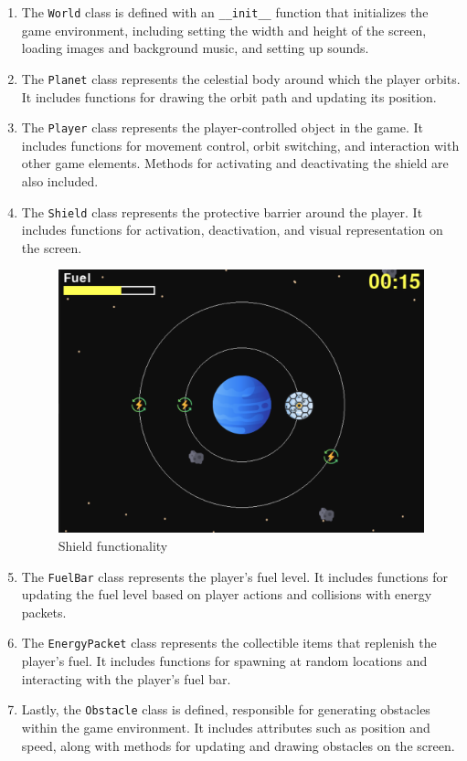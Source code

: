 \documentclass[11pt, a4paper]{article}
\begin{document}
\begin{enumerate}
\item The \texttt{World} class is defined with an \texttt{\_\_init\_\_} function that initializes the game environment, including setting the width and height of the screen, loading images and background music, and setting up sounds.
\item The \texttt{Planet} class represents the celestial body around which the player orbits. It includes functions for drawing the orbit path and updating its position.
\item The \texttt{Player} class represents the player-controlled object in the game. It includes functions for movement control, orbit switching, and interaction with other game elements. Methods for activating and deactivating the shield are also included.
\item The \texttt{Shield} class represents the protective barrier around the player. It includes functions for activation, deactivation, and visual representation on the screen.

\vspace{10pt}
\begin{figure}[h]
\centering
\includegraphics[scale=0.5]{figure2}
\caption{Shield functionality}
\end{figure}

\item The \texttt{FuelBar} class represents the player's fuel level. It includes functions for updating the fuel level based on player actions and collisions with energy packets.
\item The \texttt{EnergyPacket} class represents the collectible items that replenish the player's fuel. It includes functions for spawning at random locations and interacting with the player's fuel bar.
\item Lastly, the \texttt{Obstacle} class is defined, responsible for generating obstacles within the game environment. It includes attributes such as position and speed, along with methods for updating and drawing obstacles on the screen.
\end{enumerate}
\end{document}
